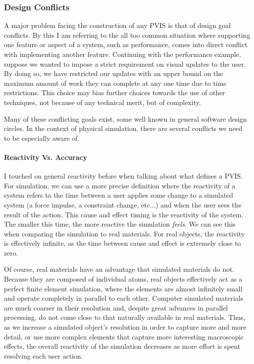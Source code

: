 \documentclass[12pt,oneside,letterpaper]{memoir}
\begin{document}




\subsubsection{Design Conflicts}

A major problem facing the construction of any PVIS is that of design
goal conflicts. By this I am referring to the all too common situation
where supporting one feature or aspect of a system, such as
performance, comes into direct conflict with implementing another
feature. Continuing with the performance example, suppose we wanted to
impose a strict requirement on visual updates to the user. By doing
so, we have restricted our updates with an upper bound on the maximum
amount of work they can complete at any one time due to time
restrictions. This choice may bias further choices towards the use of
other techniques, not because of any technical merit, but of
complexity.

Many of these conflicting goals exist, some well known in general
software design circles. In the context of physical simulation, there
are several conflicts we need to be especially aware of.


\paragraph{Reactivity Vs. Accuracy}
I touched on general reactivity before when talking about what defines
a PVIS. For simulation, we can use a more precise definition where the
reactivity of a system refers to the time between a user applies some
change to a simulated system (a force impulse, a constraint change,
etc...) and when the user sees the result of the action. This cause
and effect timing is the reactivity of the system. The smaller this
time, the more reactive the simulation \textit{feels}. We can see this
when comparing the simulation to real materials. For real objects, the
reactivity is effectively infinite, as the time between cause and
effect is extremely close to zero.

Of course, real materials have an advantage that simulated materials
do not. Because they are composed of individual atoms, real objects
effectively act as a perfect finite element simulation, where the
elements are almost infinitely small and operate completely in
parallel to each other. Computer simulated materials are much coarser
in their resolution and, despite great advances in parallel
processing, do not come close to that naturally available in real
materials. Thus, as we increase a simulated object's resolution in
order to capture more and more detail, or use more complex elements
that capture more interesting macroscopic effects, the overall
reactivity of the simulation decreases as more effort is spent
resolving each user action.
\end{document}

